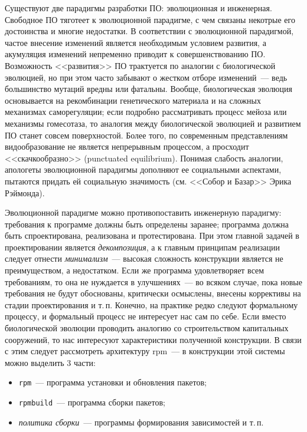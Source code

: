 \documentclass[russian,a4paper,12pt,titlepage]{article}
\begin{document}
Существуют две парадигмы разработки ПО: эволюционная и инженерная.  Свободное ПО тяготеет к эволюционной парадигме, с чем связаны
некотрые его достоинства и многие недостатки.  В соответствии с эволюционной парадигмой, частое внесение изменений является необходимым
условием развития, а акумуляция изменений непременно приводит к совершенствованию ПО.  Возможность <<развития>> ПО трактуется
по аналогии с биологической эволюцией, но при этом часто забывают о жестком отборе изменений~--- ведь большинство мутаций
вредны или фатальны.  Вообще, биологическая эволюция основывается на рекомбинации генетического материала и на сложных механизмах
саморегуляции; если подробно рассматривать процесс мейоза или механизмы гомесотаза, то аналогия между биологической эволюцией
и развитием ПО станет совсем поверхностой.  Более того, по современным представлениям видообразование не является непрерывным процессом,
а просходит <<скачкообразно>> (punctuated equilibrium).
Понимая слабость аналогии, апологеты эволюционной парадигмы дополняют ее социальными аспектами, пытаются
придать ей социальную значимость (см. <<Собор и Базар>> Эрика Рэймонда).

Эволюционной парадигме можно противопоставить инженерную парадигму: требования к программе должны быть определены заранее;
программа должна быть спроектирована, реализована и протестирована.  При этом главной задачей в проектировании является
\emph{декомпозиция}, а к главным принципам реализации следует отнести \emph{минимализм}~--- 
высокая сложность конструкции является не преимуществом, а недостатком.  Если же программа удовлетворяет всем требованиям,
то она не нуждается в улучшениях~--- во всяком случае, пока новые требования не будут обоснованы, критически осмыслены, внесены
коррективы на стадии проектирования и т.\,п.  Конечно, на практике редко следуют формальному процессу, и формальный процесс
не интересует нас сам по себе.  Если вместо биологической эволюции проводить аналогию со строительством капитальных сооружений,
то нас интересуют характеристики полученной конструкции.  В связи с этим следует рассмотреть архитектуру rpm~---
в конструкции этой системы можно выделить 3 части:
\begin{itemize}
\item \verb|rpm|~--- программа установки и обновления пакетов;
\item \verb|rpmbuild|~--- программа сборки пакетов;
\item \emph{политика сборки}~--- программы формирования зависимостей и т.\,п.
\end{itemize}
\end{document}

